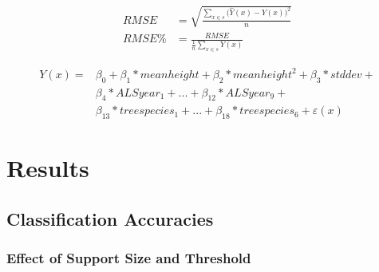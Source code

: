 \begin{subequations}\label{eq:RMSE}
	\begin{align}
	RMSE &= \sqrt{\frac{\sum_{x \in s}\big(\hat{Y}(x)-Y(x)\big)^2}{n}} \label{eq:RMSEa}\\
	RMSE\% &= \frac{RMSE}{\frac{1}{n}\sum_{x \in s}Y(x)}	\label{eq:RMSEb}
	\end{align}
\end{subequations}


\begin{equation} \label{eq:chmtspec_fullmod_term}
\begin{split}
Y(x) = &\beta_{0} + \beta_{1}*meanheight + \beta_{2}*meanheight^{2} + \beta_{3}*stddev + \\
&\beta_{4}*ALSyear_1 + ... + \beta_{12}*ALSyear_9 + \\
&\beta_{13}*treespecies_1 + ... + \beta_{18}*treespecies_6 + \varepsilon(x)
\end{split}
\end{equation}




\section{Results}
\label{sec:Res}

\subsection{Classification Accuracies}
\label{sec:supp_tspec_res}

\subsubsection*{Effect of Support Size and Threshold}

